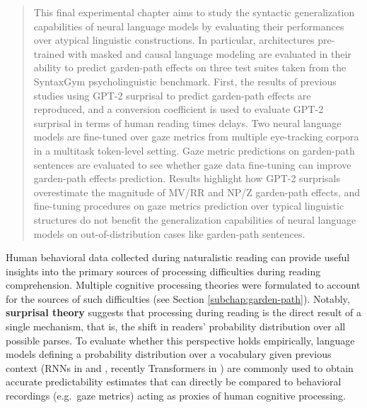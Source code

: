 \documentclass[a4paper, nobind]{templates/ociamthesis}
\begin{document}
\begin{quote}
This final experimental chapter aims to study the syntactic generalization capabilities of neural language models by evaluating their performances over atypical linguistic constructions. In particular, architectures pre-trained with masked and causal language modeling are evaluated in their ability to predict garden-path effects on three test suites taken from the SyntaxGym psycholinguistic benchmark. First, the results of previous studies using GPT-2 surprisal to predict garden-path effects are reproduced, and a conversion coefficient is used to evaluate GPT-2 surprisal in terms of human reading times delays. Two neural language models are fine-tuned over gaze metrics from multiple eye-tracking corpora in a multitask token-level setting. Gaze metric predictions on garden-path sentences are evaluated to see whether gaze data fine-tuning can improve garden-path effects prediction. Results highlight how GPT-2 surprisals overestimate the magnitude of MV/RR and NP/Z garden-path effects, and fine-tuning procedures on gaze metrics prediction over typical linguistic structures do not benefit the generalization capabilities of neural language models on out-of-distribution cases like garden-path sentences.
\end{quote}

Human behavioral data collected during naturalistic reading can provide useful insights into the primary sources of processing difficulties during reading comprehension. Multiple cognitive processing theories were formulated to account for the sources of such difficulties (see Section \ref{subchap:garden-path}). Notably, \textbf{surprisal theory} \autocites{hale-2001-probabilistic}{levy-2008-expectation} suggests that processing during reading is the direct result of a single mechanism, that is, the shift in readers' probability distribution over all possible parses. To evaluate whether this perspective holds empirically, language models defining a probability distribution over a vocabulary given previous context (RNNs in \textcite{elman-1991-distributed} and \textcite{mikolov-etal-2010-recurrent}, recently Transformers in \textcite{hu-etal-2020-systematic}) are commonly used to obtain accurate predictability estimates that can directly be compared to behavioral recordings (e.g.~gaze metrics) acting as proxies of human cognitive processing.
\end{document}
